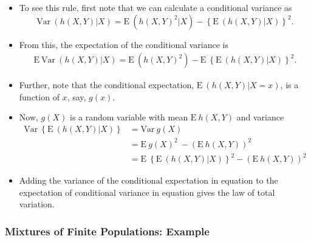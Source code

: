 \documentclass[]{book}
\theoremstyle{definition}
\theoremstyle{definition}
\theoremstyle{definition}
\theoremstyle{remark}
\begin{document}
\begin{itemize}
\item
  To see this rule, first note that we can calculate a conditional
  variance as \[\mathrm{Var~} \left( h(X,Y) | X \right)  =
  \mathrm{E~} \left( h(X,Y)^2 | X \right) -\left\{\mathrm{E~} \left( h(X,Y) | X \right) \right\}^2.\]
\item
  From this, the expectation of the conditional variance is
  \[\begin{aligned}
  \label{E:E1} \mathrm{E~} \mathrm{Var~} \left( h(X,Y) | X \right)  =
  \mathrm{E~} \left( h(X,Y)^2\right) - \mathrm{E~}\left\{\mathrm{E~} \left( h(X,Y) | X \right) \right\}^2.\end{aligned}\]
\item
  Further, note that the conditional expectation,
  \(\mathrm{E~} \left( h(X,Y) | X=x \right)\), is a function of \(x\),
  say, \(g(x)\).
\item
  Now, \(g(X)\) is a random variable with mean \(\mathrm{E~} h(X,Y)\)
  and variance \[\begin{aligned}
  \label{E:E2}
  \mathrm{Var~} \left\{ \mathrm{E~} \left( h(X,Y) | X \right) \right \} &=\mathrm{Var~} g(X)  \nonumber \\
  &= \mathrm{E~} g(X)^2\ - \left(\mathrm{E~} h(X,Y)\right)^2 \nonumber\\
  &= \mathrm{E~} \left\{\mathrm{E~} \left( h(X,Y) | X \right) \right\}^2
  - \left(\mathrm{E~} h(X,Y)\right)^2\end{aligned}\]
\item
  Adding the variance of the conditional expectation in equation to the
  expectation of conditional variance in equation gives the law of total
  variation.
\end{itemize}

\subsubsection{Mixtures of Finite Populations:
Example}\label{mixtures-of-finite-populations-example}
\end{document}
